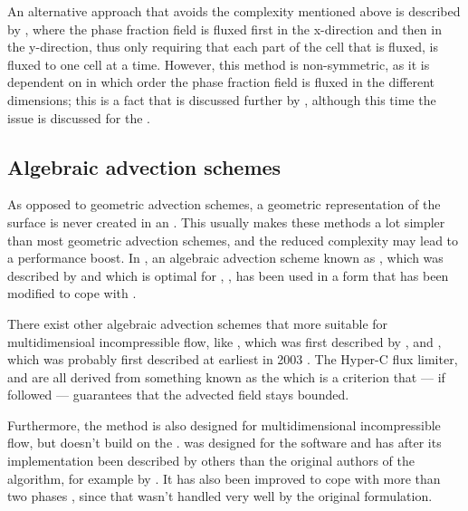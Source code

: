 An alternative approach that avoids the complexity mentioned above is described by \citet{Aulisa2003}, where the phase fraction field is fluxed first in the x-direction and then in the y-direction, thus only requiring that each part of the cell that is fluxed, is fluxed to one cell at a time. However, this method is non-symmetric, as it is dependent on in which order the phase fraction field is fluxed in the different dimensions; this is a fact that is discussed further by \citet{Ubbink1999}, although this time the issue is discussed for the  .

\subsection{Algebraic advection schemes}

As opposed to geometric advection schemes, a geometric representation of the surface is never created in an . This usually makes these methods a lot simpler than most geometric advection schemes, and the reduced complexity may lead to a performance boost. In \thisprojectwork, an algebraic advection scheme known as , which was described by \citet{Leonard1988} and which is optimal for , , has been used in a form that has been modified to cope with .

There exist other algebraic advection schemes that more suitable for multidimensioal incompressible flow, like \CICSAM, which was first described by \citet{Ubbink1999}, and \STACS, which was probably first described at earliest in 2003 \citep{Darwish}. The Hyper-C flux limiter, \CICSAM and \STACS are all derived from something known as the \CBC which is a criterion that --- if followed --- guarantees that the advected field stays bounded.

Furthermore, the \MULES method is also designed for multidimensional incompressible flow, but doesn't build on the \CBC. \MULES was designed for the  software  and has after its implementation been described by others than the original authors of the algorithm, for example by \citet{Berberovi2009}. It has also been improved to cope with more than two phases \citep{Kissling2010}, since that wasn't handled very well by the original formulation.


